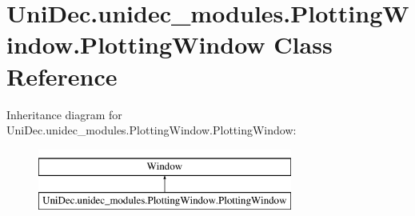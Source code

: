 \hypertarget{class_uni_dec_1_1unidec__modules_1_1_plotting_window_1_1_plotting_window}{}\section{Uni\+Dec.\+unidec\+\_\+modules.\+Plotting\+Window.\+Plotting\+Window Class Reference}
\label{class_uni_dec_1_1unidec__modules_1_1_plotting_window_1_1_plotting_window}
Inheritance diagram for Uni\+Dec.\+unidec\+\_\+modules.\+Plotting\+Window.\+Plotting\+Window\+:\begin{figure}[H]
\begin{center}
\leavevmode
\includegraphics[height=2.000000cm]{class_uni_dec_1_1unidec__modules_1_1_plotting_window_1_1_plotting_window}
\end{center}
\end{figure}

